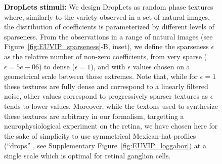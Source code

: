 \documentclass{article}
\begin{document}
\begin{figure}[ht!]%
\caption{
{\bf DropLets stimuli:} We design DropLets as random phase textures where, similarly to the variety observed in a set of natural images, the distribution of coefficients is parameterized by different levels of sparseness. From the observations in a range of natural images (see Figure~\ref{fig:EUVIP_sparseness}-B, inset), we define the sparseness $\epsilon$ as the relative number of non-zero coefficients, from very sparse ($\epsilon=5e-06$) to dense ($\epsilon=1$), and with $\epsilon$ values chosen on a geometrical scale between those extremes. Note that, while for $\epsilon=1$ these textures are fully dense and correspond to a linearly filtered noise,  other values correspond to progressively sparser textures as $\epsilon$ tends to lower values. Moreover, while the textons used to synthesize these textures are arbitrary in our formalism, targetting a neurophysiological experiment on the retina, we have chosen here for the sake of simplicity to use symmetrical Mexican-hat profiles (``drops''\if{} , see Supplementary Figure~\ref{fig:EUVIP_loggabor}\fi) at a single scale which is optimal for retinal ganglion cells.
\label{fig:DropLets}}%
\end{figure}%
\end{document}
